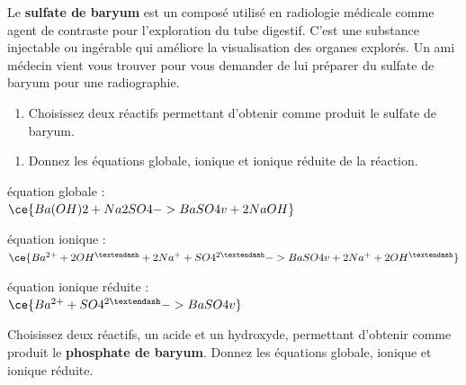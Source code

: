 \documentclass[
  11pt,
  french,
  a4paper,
  openany]{book}
\providecommand{\tightlist}{%
  \setlength{\itemsep}{0pt}\setlength{\parskip}{0pt}}
\begin{document}
\begin{Exercise}

Le \textbf{sulfate de baryum} est un composé utilisé en radiologie médicale comme agent de contraste pour l'exploration du tube digestif. C'est une substance injectable ou ingérable qui améliore la visualisation des organes explorés. Un ami médecin vient vous trouver pour vous demander de lui préparer du sulfate de baryum pour une radiographie.

\begin{enumerate}
\def\labelenumi{\arabic{enumi}.}
\tightlist
\item
  Choisissez deux réactifs permettant d'obtenir comme produit le sulfate de baryum.
\end{enumerate}


\begin{enumerate}
\def\labelenumi{\arabic{enumi}.}
\setcounter{enumi}{1}
\tightlist
\item
  Donnez les équations globale, ionique et ionique réduite de la réaction.
\end{enumerate}



\end{Exercise}

\begin{Answer}
équation globale :\\
\(\ce{Ba(OH)2 + Na2SO4 -> BaSO4 v + 2 NaOH}\)

équation ionique :\\
\(\ce{Ba^{2+} + 2 OH^{–} + 2 Na^{+} + SO4^{2–} -> BaSO4 v + 2 Na^{+} + 2 OH^{–}}\)

équation ionique réduite :\\
\(\ce{Ba^{2+} + SO4^{2–} -> BaSO4 v}\)

\end{Answer}

\begin{Exercise}

Choisissez deux réactifs, un acide et un hydroxyde, permettant d'obtenir comme produit le \textbf{phosphate de baryum}. Donnez les équations globale, ionique et ionique réduite.



\end{Exercise}
\end{document}
